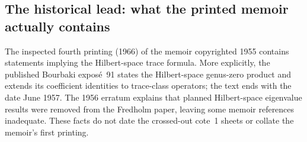 \subsection{The historical lead: what the printed memoir actually contains}
\begin{proposition}
\label{geo-H-history}
The inspected fourth printing (1966) of the memoir copyrighted 1955
contains statements implying the Hilbert-space trace formula. More explicitly,
the published Bourbaki expos\'e~91 states the Hilbert-space genus-zero
product and extends its coefficient identities to trace-class operators;
the text ends with the date June 1957. The 1956
erratum explains that planned Hilbert-space eigenvalue results were removed
from the Fredholm paper, leaving some memoir references inadequate.
These facts do not date the crossed-out cote~1 sheets or collate the
memoir's first printing.
\end{proposition}
